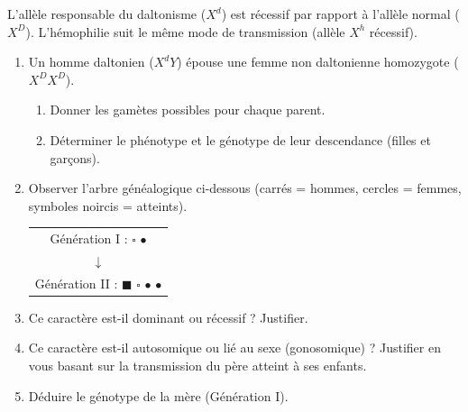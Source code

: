 \documentclass[11pt]{article}
\begin{document}
\begin{exercice}
L'allèle responsable du daltonisme ($X^d$) est récessif par rapport à l'allèle normal ($X^D$). L'hémophilie suit le même mode de transmission (allèle $X^h$ récessif).
\begin{enumerate}
    \item Un homme daltonien ($X^dY$) épouse une femme non daltonienne homozygote ($X^DX^D$).
    \begin{enumerate}
        \item Donner les gamètes possibles pour chaque parent.
        \item Déterminer le phénotype et le génotype de leur descendance (filles et garçons).
    \end{enumerate}
    \item Observer l'arbre généalogique ci-dessous (carrés = hommes, cercles = femmes, symboles noircis = atteints).
    \begin{center}
    \begin{tabular}{cccc}
    \multicolumn{4}{c}{Génération I : $\square$ \hspace{2mm} $\bullet$} \\
    \multicolumn{4}{c}{$\downarrow$} \\
    \multicolumn{4}{c}{Génération II : $\blacksquare$ \hspace{2mm} $\square$ \hspace{2mm} $\bullet$ \hspace{2mm} $\bullet$} \\
    \end{tabular}
    \end{center}
    \item Ce caractère est-il dominant ou récessif ? Justifier.
    \item Ce caractère est-il autosomique ou lié au sexe (gonosomique) ? Justifier en vous basant sur la transmission du père atteint à ses enfants.
    \item Déduire le génotype de la mère (Génération I).
\end{enumerate}
\end{exercice}
\end{document}
